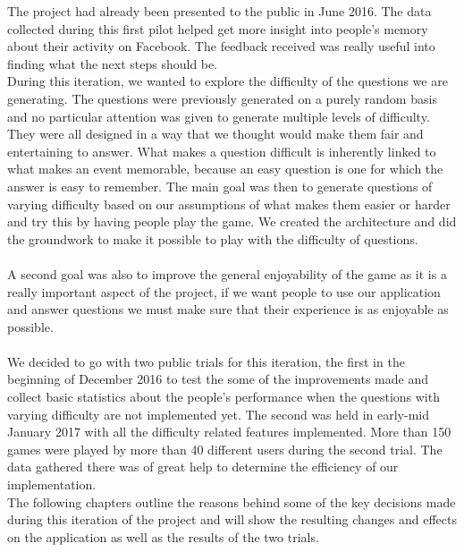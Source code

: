 The project had already been presented to the public in June 2016. The data collected during this first pilot helped get more insight into people's memory about their activity on Facebook. The feedback received was really useful into finding what the next steps should be.\\
During this iteration, we wanted to explore the difficulty of the questions we are generating. The questions were previously generated on a purely random basis and no particular attention was given to generate multiple levels of difficulty. They were all designed in a way that we thought would make them fair and entertaining to answer. What makes a question difficult is inherently linked to what makes an event memorable, because an easy question is one for which the answer is easy to remember. The main goal was then to generate questions of varying difficulty based on our assumptions of what makes them easier or harder and try this by having people play the game. We created the architecture and did the groundwork to make it possible to play with the difficulty of questions.\\\\
A second goal was also to improve the general enjoyability of the game as it is a really important aspect of the project, if we want people to use our application and answer questions we must make sure that their experience is as enjoyable as possible.\\\\
We decided to go with two public trials for this iteration, the first in the beginning of December 2016 to test the some of the improvements made and collect basic statistics about the people's performance when the questions with varying difficulty are not implemented yet. The second was held in early-mid January 2017 with all the difficulty related features implemented. More than 150 games were played by more than 40 different users during the second trial. The data gathered there was of great help to determine the efficiency of our implementation.\\
The following chapters outline the reasons behind some of the key decisions made during this iteration of the project and will show the resulting changes and effects on the application as well as the results of the two trials.